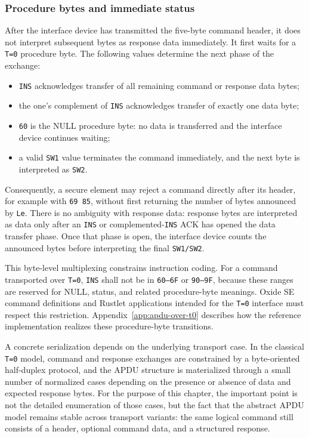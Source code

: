 \subsubsection{Procedure bytes and immediate status}
\label{sec:apdu-t0-procedure-bytes}

After the interface device has transmitted the five-byte command
header, it does not interpret subsequent bytes as response data
immediately. It first waits for a \texttt{T=0} procedure byte. The
following values determine the next phase of the exchange:

\begin{itemize}
\item \texttt{INS} acknowledges transfer of all remaining command or
  response data bytes;
\item the one's complement of \texttt{INS} acknowledges transfer of
  exactly one data byte;
\item \texttt{60} is the NULL procedure byte: no data is transferred
  and the interface device continues waiting;
\item a valid \texttt{SW1} value terminates the command immediately,
  and the next byte is interpreted as \texttt{SW2}.
\end{itemize}

Consequently, a secure element may reject a command directly after its
header, for example with \texttt{69 85}, without first returning the
number of bytes announced by \texttt{Le}. There is no ambiguity with
response data: response bytes are interpreted as data only after an
\texttt{INS} or complemented-\texttt{INS} ACK has opened the data
transfer phase. Once that phase is open, the interface device counts the
announced bytes before interpreting the final \texttt{SW1/SW2}.

This byte-level multiplexing constrains instruction coding. For a
command transported over \texttt{T=0}, \texttt{INS} shall not be in
\texttt{60--6F} or \texttt{90--9F}, because these ranges are reserved
for NULL, status, and related procedure-byte meanings. Oxide SE command
definitions and Rustlet applications intended for the \texttt{T=0}
interface must respect this restriction. Appendix~\ref{app:apdu-over-t0}
describes how the reference implementation realizes these
procedure-byte transitions.

A concrete serialization depends on the underlying transport case. In the
classical \texttt{T=0} model, command and response exchanges are constrained by
a byte-oriented half-duplex protocol, and the APDU structure is materialized
through a small number of normalized cases depending on the presence or absence
of data and expected response bytes.  For the purpose of this chapter, the
important point is not the detailed enumeration of those cases, but the fact
that the abstract APDU model remains stable across transport variants: the same
logical command still consists of a header, optional command data, and a
structured response.


